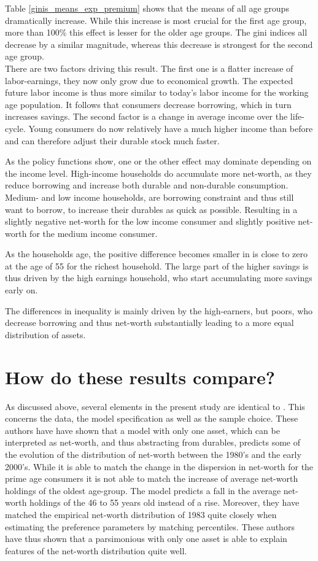 \documentclass[12pt,a4paper,leqno]{article}
\theoremstyle{definition}
\begin{document}
Table \ref{ginis_means_exp_premium} shows that the means of all age groups dramatically increase. While this increase is most crucial for the first age group, more than 100\% this effect is lesser for the older age groups. The gini indices all decrease by a similar magnitude, whereas this decrease is strongest for the second age group. \\

There are two factors driving this result. The first one is a flatter increase of labor-earnings, they now only grow due to economical growth. The expected future labor income is thus more similar to today's labor income for the working age population. It follows that consumers decrease borrowing, which in turn increases savings. The second factor is a change in average income over the life-cycle. Young consumers do now relatively have a much higher income than before and can therefore adjust their durable stock much faster. 

As the policy functions show, one or the other effect may dominate depending on the income level. High-income households do accumulate more net-worth, as they reduce borrowing and increase both durable and non-durable consumption. Medium- and low income households, are borrowing constraint and thus still want to borrow, to increase their durables as quick as possible. Resulting in a slightly negative net-worth for the low income consumer and slightly positive net-worth for the medium income consumer. 

As the households age, the positive difference becomes smaller in is close to zero at the age of 55 for the richest household. 
The large part of the higher savings is thus driven by the high earnings household, who start accumulating more savings early on. 

The differences in inequality is mainly driven by the high-earners, but poors, who decrease borrowing and thus net-worth substantially leading to a more equal distribution of assets. 

\section{How do these results compare?} As discussed above, several elements in the present study are identical to \cite{hintermaier2011}. This concerns the data, the model specification as well as the sample choice. These authors have have shown that a model with only one asset, which can be interpreted as net-worth, and thus abstracting from durables, predicts some of the evolution of the distribution of net-worth between the 1980's and the early 2000's. While it is able to match the change in the dispersion in net-worth for the prime age consumers it is not able to match the increase of average net-worth holdings of the oldest age-group. The model predicts a fall in the average net-worth holdings of the 46 to 55 years old instead of a rise. Moreover, they have matched the empirical net-worth distribution of 1983 quite closely when estimating the preference parameters by matching percentiles. These authors have thus shown that a parsimonious with only one asset is able to explain features of the net-worth distribution quite well. 
\end{document}
